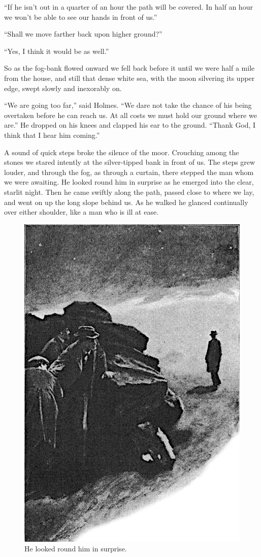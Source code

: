 \documentclass[paper=5.5in:8.5in,BCOR=7mm,twoside,DIV=calc,12pt,usegeometry,openany,chapterprefix,endperiod,headings=big]{scrbook} %
\begin{document}
\enquote{If he isn't out in a quarter of an hour the path will be covered. In half an hour we won't be able to see our hands in front of us.}

\enquote{Shall we move farther back upon higher ground?}

\enquote{Yes, I think it would be as well.}

So as the fog-bank flowed onward we fell back before it until we were half a mile from the house, and still that dense white sea, with the moon silvering its upper edge, swept slowly and inexorably on.

\enquote{We are going too far,} said Holmes. \enquote{We dare not take the chance of his being overtaken before he can reach us. At all costs we must hold our ground where we are.} He dropped on his knees and clapped his ear to the ground. \enquote{Thank God, I think that I hear him coming.}

A sound of quick steps broke the silence of the moor. Crouching among the stones we stared intently at the silver-tipped bank in front of us. The steps grew louder, and through the fog, as through a curtain, there stepped the man whom we were awaiting. He looked round him in surprise as he emerged into the clear, starlit night. Then he came swiftly along the path, passed close to where we lay, and went on up the long slope behind us. As he walked he glanced continually over either shoulder, like a man who is ill at ease.

\begin{figure}[tbph]
\centering
\includegraphics[width=.8\linewidth]{14_lookedround}
\caption{He looked round him in surprise.}
\end{figure}
\end{document}

